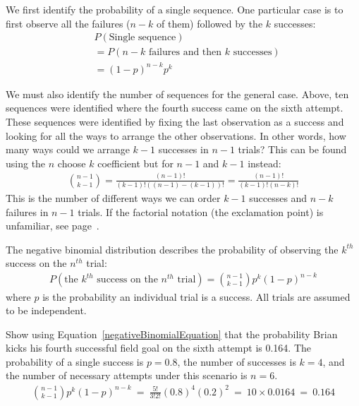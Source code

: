 We first identify the probability of a single sequence. One particular case is to first observe all the failures ($n-k$ of them) followed by the $k$ successes:
\begin{align*}
&P(\text{Single sequence}) \\
&= P(\text{$n-k$ failures and then $k$ successes}) \\
&= (1-p)^{n-k} p^{k}
\end{align*}

We must also identify the number of sequences for the general case. Above, ten sequences were identified where the fourth success came on the sixth attempt. These sequences were identified by fixing the last observation as a success and looking for all the ways to arrange the other observations. In other words, how many ways could we arrange $k-1$ successes in $n-1$ trials? This can be found using the $n$ choose $k$ coefficient but for $n-1$ and $k-1$ instead:
\begin{eqnarray*}
{n-1 \choose k-1} = \frac{(n-1)!}{(k-1)! \left((n-1) - (k-1)\right)!} = \frac{(n-1)!}{(k-1)! \left(n - k\right)!}
\end{eqnarray*}
This is the number of different ways we can order $k-1$ successes and $n-k$ failures in $n-1$ trials. If the factorial notation (the exclamation point) is unfamiliar, see page~\pageref{factorialDefinitionInTheBinomialSection}.

\begin{termBox}{
The negative binomial distribution describes the probability of observing the $k^{th}$ success on the $n^{th}$ trial:
\begin{eqnarray}
P(\text{the $k^{th}$ success on the $n^{th}$ trial}) = {n-1 \choose k-1} p^{k}(1-p)^{n-k}
\label{negativeBinomialEquation}
\end{eqnarray}
where $p$ is the probability an individual trial is a success. All trials are assumed to be independent.}
\end{termBox}

\textC{\pagebreak}

\begin{example}{Show using Equation~\eqref{negativeBinomialEquation} that the probability Brian kicks his fourth successful field goal on the sixth attempt is 0.164.}
The probability of a single success is $p=0.8$, the number of successes is $k=4$, and the number of necessary attempts under this scenario is $n=6$.
\begin{align*}
{n-1 \choose k-1}p^k(1-p)^{n-k}\ 
	=\ \frac{5!}{3!2!} (0.8)^4 (0.2)^2\ 
	=\ 10\times 0.0164\ 
	=\ 0.164
\end{align*}
\end{example}

